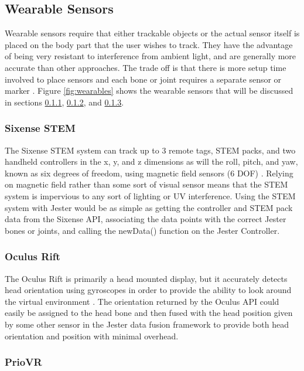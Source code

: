 \subsection{Wearable Sensors}

Wearable sensors require that either trackable objects or the actual sensor itself is placed on the body part that the user wishes to track. They have the advantage of being very resistant to interference from ambient light, and are generally more accurate than other approaches. The trade off is that there is more setup time involved to place sensors and each bone or joint requires a separate sensor or marker \cite{zhu2004real}. Figure \ref{fig:wearables} shows the wearable sensors that will be discussed in sections \ref{sec:sixense}, \ref{sec:oculus}, and \ref{sec:prio}. 

\subsubsection{Sixense STEM}\label{sec:sixense}

The Sixense STEM system can track up to 3 remote tags, STEM packs, and two handheld controllers in the x, y, and z dimensions as will the roll, pitch, and yaw, known as six degrees of freedom, using magnetic field sensors (6 DOF) \cite{sixense_stem}. Relying on magnetic field rather than some sort of visual sensor means that the STEM system is impervious to any sort of lighting or UV interference. Using the STEM system with Jester would be as simple as getting the controller and STEM pack data from the Sixense API, associating the data points with the correct Jester bones or joints, and calling the newData() function on the Jester Controller.

\subsubsection{Oculus Rift}\label{sec:oculus}

The Oculus Rift is primarily a head mounted display, but it accurately detects head orientation using gyroscopes in order to provide the ability to look around the virtual environment \cite{oculus2012oculus}. The orientation returned by the Oculus API could easily be assigned to the head bone and then fused with the head position given by some other sensor in the Jester data fusion framework to provide both head orientation and position with minimal overhead.

\subsubsection{PrioVR}\label{sec:prio}

